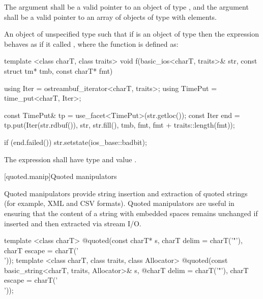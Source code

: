 \begin{itemdescr}
\pnum
\requires The argument  shall be a valid pointer to an object of type
, and the argument  shall be a valid pointer to an
array of objects of type  with
 elements.

\pnum
\returns An object of unspecified type such that if  is an object of
type  then the expression  behaves as if it called , where the
function \tcode{f} is defined as:

\begin{codeblock}
template <class charT, class traits>
void f(basic_ios<charT, traits>& str, const struct tm* tmb, const charT* fmt) {
  using Iter    = ostreambuf_iterator<charT, traits>;
  using TimePut = time_put<charT, Iter>;

  const TimePut& tp = use_facet<TimePut>(str.getloc());
  const Iter end = tp.put(Iter(str.rdbuf()), str, str.fill(), tmb,
    fmt, fmt + traits::length(fmt));

  if (end.failed())
    str.setstate(ios_base::badbit);
}
\end{codeblock}

The expression  shall have type
\tcode{basic_ostream<charT, traits>\&} and value \tcode{out}.
\end{itemdescr}

[quoted.manip]{Quoted manipulators}

\pnum
\enternote Quoted manipulators provide string insertion and extraction of quoted strings (for example, XML and CSV formats). Quoted manipulators are useful in ensuring that the content of a string with embedded spaces remains unchanged if inserted and then extracted via stream I/O. \exitnote

%
\begin{itemdecl}
template <class charT>
  @\unspec@ quoted(const charT* s, charT delim = charT('"'), charT escape = charT('\\'));
template <class charT, class traits, class Allocator>
  @\unspec@ quoted(const basic_string<charT, traits, Allocator>& s,
  @\itcorr@                   charT delim = charT('"'), charT escape = charT('\\'));
\end{itemdecl}

